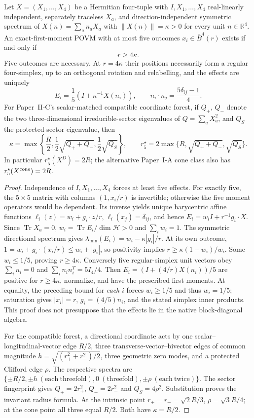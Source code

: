 \documentclass[12pt,a4paper]{article}
\begin{document}
\begin{theorem}
\label{p2c:thm:v266-five-threshold}
Let $X=(X_1,\ldots,X_4)$ be a Hermitian four-tuple with
$I,X_1,\ldots,X_4$ real-linearly independent, separately traceless
$X_a$, and direction-independent symmetric spectrum of $X(n)=\sum_an_aX_a$
with $\|X(n)\|=\kappa>0$ for every unit $n\in\mathbb R^4$.
An exact-first-moment POVM with at most five outcomes $x_i\in\overline
B^4(r)$ exists if and only if
\[
\boxed{r\ge4\kappa.}
\]
Five outcomes are necessary. At $r=4\kappa$ their positions necessarily
form a regular four-simplex, up to an orthogonal rotation and relabelling,
and the effects are uniquely
\[
E_i=\frac15\left(I+\kappa^{-1}X(n_i)\right),\qquad
n_i\cdot n_j=\frac{5\delta_{ij}-1}{4}.
\]
For Paper~II-C's scalar-matched compatible coordinate forest, if $Q_+$,
$Q_-$ denote the two three-dimensional irreducible-sector eigenvalues
of $Q=\sum_aX_a^2$, and $Q_S$ the protected-sector eigenvalue, then
\[
\kappa=\max\left\{\frac R2,\frac12\sqrt{Q_++Q_-},
\frac12\sqrt{Q_S}\right\},\qquad
\boxed{r_5^\star=2\max\{R,\sqrt{Q_++Q_-},\sqrt{Q_S}\}}.
\]
In particular $r_5^\star(X^D)=2R$; the alternative Paper~I-A cone
class also has $r_5^\star(X^{\rm cone})=2R$.
\end{theorem}
\begin{proof}
Independence of $I,X_1,\ldots,X_4$ forces at least five effects. For
exactly five, the $5\times5$ matrix with columns $(1,x_i/r)$ is invertible;
otherwise the five moment operators would be dependent. Its inverse yields
unique barycentric affine functions
$\ell_i(z)=w_i+g_i\cdot z/r$, $\ell_i(x_j)=\delta_{ij}$, and hence
$E_i=w_iI+r^{-1}g_i\cdot X$. Since $\operatorname{Tr}X_a=0$,
$w_i=\operatorname{Tr}E_i/\dim\mathcal H>0$ and $\sum_iw_i=1$.
The symmetric directional spectrum gives
$\lambda_{\min}(E_i)=w_i-\kappa|g_i|/r$.
At its own outcome,
$1=w_i+g_i\cdot(x_i/r)\le w_i+|g_i|$, so positivity implies
$r\ge\kappa(1-w_i)/w_i$. Some $w_i\le1/5$, proving $r\ge4\kappa$.
Conversely five regular-simplex unit vectors obey
$\sum_i n_i=0$ and $\sum_in_in_i^T=5I_4/4$.
Then $E_i=(I+(4/r)X(n_i))/5$ are positive for $r\ge4\kappa$,
normalize, and have the prescribed first moments. At equality, the preceding
bound for \emph{each} $i$ forces $w_i\ge1/5$ and thus $w_i=1/5$;
saturation gives $|x_i|=r$, $g_i=(4/5)n_i$, and the stated simplex
inner products. This proof does not presuppose that the effects lie in
the native block-diagonal algebra.

For the compatible forest, a directional coordinate acts by one
scalar--longitudinal-vector edge $R/2$, three transverse-vector--bivector
edges of common magnitude
$h=\sqrt{(r_+^2+r_-^2)/2}$, three geometric zero modes, and a
protected Clifford edge $\rho$. The respective spectra are
$\{\pm R/2,\pm h\ (\mathrm{each\ threefold}),0\ (\mathrm{threefold}),
\pm\rho\ (\mathrm{each\ twice})\}$.
The sector fingerprint gives $Q_+=2r_+^2$, $Q_-=2r_-^2$ and
$Q_S=4\rho^2$. Substitution proves the invariant radius formula.
At the intrinsic point $r_+=r_-=\sqrt2R/3$, $\rho=\sqrt3R/4$;
at the cone point all three equal $R/2$. Both have $\kappa=R/2$.
\end{proof}
\end{document}
